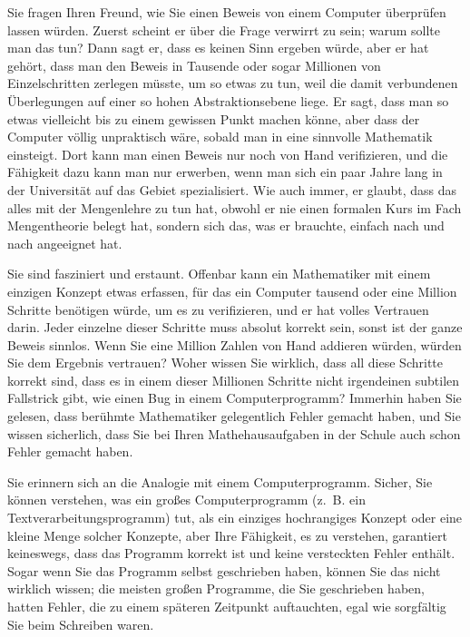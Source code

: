 Sie fragen Ihren Freund, wie Sie einen Beweis von einem Computer überprüfen lassen würden.
Zuerst scheint er über die Frage verwirrt zu sein; warum sollte man das tun?
Dann sagt er, dass es keinen Sinn ergeben würde, aber er hat gehört, dass man den Beweis in Tausende oder sogar Millionen von Einzelschritten zerlegen müsste, um so etwas zu tun, weil die damit verbundenen Überlegungen auf einer so hohen Abstraktionsebene liege.  Er sagt, dass man so etwas vielleicht bis zu einem gewissen Punkt machen könne, aber dass der Computer völlig unpraktisch wäre, sobald man in eine sinnvolle Mathematik einsteigt.  Dort kann man einen Beweis nur noch von Hand verifizieren, und die Fähigkeit dazu kann man nur erwerben, wenn man sich ein paar Jahre lang in der Universität auf das Gebiet spezialisiert.  Wie auch immer, er glaubt, dass das alles mit der Mengenlehre zu tun hat, obwohl er nie einen formalen Kurs im Fach Mengentheorie belegt hat, sondern sich das, was er brauchte, einfach nach und nach angeeignet hat.

Sie sind fasziniert und erstaunt.  Offenbar kann ein Mathematiker mit einem einzigen Konzept etwas erfassen, für das ein Computer tausend oder eine Million Schritte benötigen würde, um es zu verifizieren, und er hat volles Vertrauen darin.  Jeder einzelne dieser Schritte muss absolut korrekt sein, sonst ist der ganze Beweis sinnlos.  Wenn Sie eine Million Zahlen von Hand addieren würden, würden Sie dem Ergebnis vertrauen?  Woher wissen Sie wirklich, dass all diese Schritte korrekt sind, dass es in einem dieser Millionen Schritte nicht irgendeinen subtilen Fallstrick gibt, wie einen Bug in einem Computerprogramm?  Immerhin haben Sie gelesen, dass berühmte Mathematiker gelegentlich Fehler gemacht haben, und Sie wissen sicherlich, dass Sie bei Ihren Mathehausaufgaben in der Schule auch schon Fehler gemacht haben.

Sie erinnern sich an die Analogie mit einem Computerprogramm.  Sicher, Sie können verstehen, was ein großes Computerprogramm (z.~B. ein Textverarbeitungsprogramm) tut, als ein einziges hochrangiges Konzept oder eine kleine Menge solcher Konzepte, aber Ihre Fähigkeit, es zu verstehen, garantiert keineswegs, dass das Programm korrekt ist und keine versteckten Fehler enthält.  Sogar wenn Sie das Programm selbst geschrieben haben, können Sie das nicht wirklich wissen; die meisten großen Programme, die Sie geschrieben haben, hatten Fehler, die zu einem späteren Zeitpunkt auftauchten, egal wie sorgfältig Sie beim Schreiben waren.

